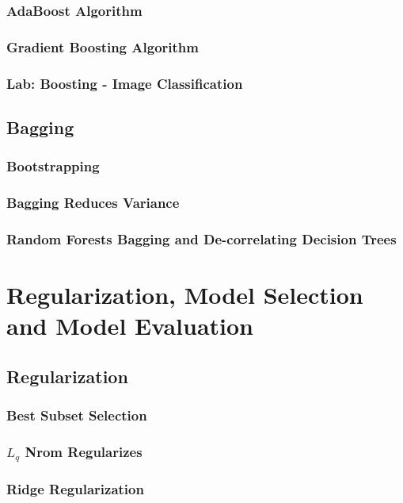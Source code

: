 \documentclass[11pt,fleqn]{book} %
\begin{document}
        \subsection{AdaBoost Algorithm}
        \subsection{Gradient Boosting Algorithm}
        \subsection{Lab: Boosting - Image Classification}
        
    \section{Bagging}
        \subsection{Bootstrapping}
            \subsubsection{} %
        \subsection{Bagging Reduces Variance}
        \subsection{Random Forests Bagging and De-correlating Decision Trees}
        
\chapter{Regularization, Model Selection and Model Evaluation}
    \section{Regularization}
        \subsection{Best Subset Selection}
        \subsection{$L_q$ Nrom Regularizes}
            \subsection{Ridge Regularization}
\end{document}
